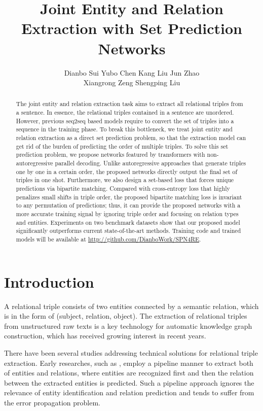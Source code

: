 \documentclass[letterpaper]{article} \usepackage{aaai21}  \usepackage{times}  \usepackage{helvet} \usepackage{courier}  \usepackage[hyphens]{url}  \usepackage{graphicx} \usepackage{amsfonts,amssymb}
\title{Joint Entity and Relation Extraction with Set Prediction Networks}
\author {
        Dianbo Sui\textsuperscript{\rm   }
        Yubo Chen\textsuperscript{\rm }
        Kang Liu\textsuperscript{\rm   } 
        Jun Zhao\textsuperscript{\rm   }  \\
        Xiangrong Zeng \textsuperscript{\rm } Shengping Liu \textsuperscript{\rm }\\
}
\begin{document}
\maketitle

\begin{abstract}
The joint entity and relation extraction task aims to extract all relational triples from a sentence. In essence, the relational triples contained in a sentence are unordered. However, previous seq2seq based models require to convert the set of triples into a sequence in the training phase. To break this bottleneck, we treat joint entity and relation extraction as a direct set prediction problem, so that the extraction model can get rid of the burden of predicting the order of multiple triples. To solve this set prediction problem, we propose networks featured by transformers with non-autoregressive parallel decoding. Unlike autoregressive approaches that generate triples one by one in a certain order, the proposed networks directly output the final set of triples in one shot. Furthermore, we also design a set-based loss that forces unique predictions via bipartite matching. Compared with cross-entropy loss that highly penalizes small shifts in triple order, the proposed bipartite matching loss is invariant to any permutation of predictions; thus, it can provide the proposed networks with a more accurate training signal by ignoring triple order and focusing on relation types and entities. Experiments on two benchmark datasets show that our proposed model significantly outperforms current state-of-the-art methods. Training code and trained models will be available at \url{http://github.com/DianboWork/SPN4RE}.
\end{abstract}

\section{Introduction}

A relational triple consists of two entities connected by a semantic relation, which is in the form of (subject, relation, object). The extraction of relational triples from unstructured raw texts is a key technology for automatic knowledge graph construction, which has received growing interest in recent years.

There have been several studies addressing technical solutions for relational triple extraction. Early researches, such as \citet{zelenko2003kernel,chan2011exploiting}, employ a pipeline manner to extract both of entities and relations, where entities are recognized first and then the relation between the extracted entities is predicted. Such a pipeline approach ignores the relevance of entity identification and relation prediction \cite{li2014incremental} and tends to suffer from the error propagation problem. 
\end{document}
